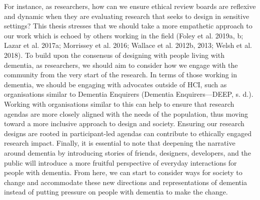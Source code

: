  For instance, as researchers, how can we ensure ethical review boards are reflexive and dynamic when they are evaluating research that seeks to design in sensitive settings? This thesis stresses that we should take a more empathetic approach to our work which is echoed by others working in the field (Foley et al. 2019a, b; Lazar et al. 2017a; Morrissey et al. 2016; Wallace et al. 2012b, 2013; Welsh et al. 2018). To build upon the consensus of designing with people living with dementia, as researchers, we should aim to consider how we engage with the community from the very start of the research. In terms of those working in dementia, we should be engaging with advocates outside of HCI, such as organisations similar to Dementia Enquirers (Dementia Enquirers—DEEP, s. d.). Working with organisations similar to this can help to ensure that research agendas are more closely aligned with the needs of the population, thus moving toward a more inclusive approach to design and society. Ensuring our research designs are rooted in participant-led agendas can contribute to ethically engaged research impact. Finally, it is essential to note that deepening the narrative around dementia by introducing stories of friends, designers, developers, and the public will introduce a more fruitful perspective of everyday interactions for people with dementia. From here, we can start to consider ways for society to change and accommodate these new directions and representations of dementia instead of putting pressure on people with dementia to make the change.
